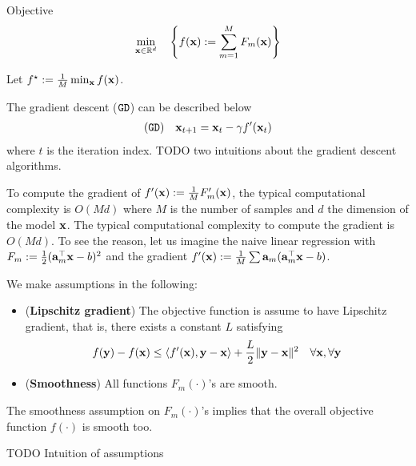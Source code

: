 Objective
\begin{align}
\min_{{\bf x} \in \mathbb{R}^d}\quad \left\{f({\bf x}):=\sum_{m=1}^M F_m({\bf x})\right\}
\label{eq:obj-gd}
\end{align}

Let $f^\star := {1\over M}\min_{{\bf x}} f({\bf x})$.

The gradient descent ($\texttt{GD}$) can be described below
\begin{align}
(\texttt{GD})\quad{\bf x}_{t+1} = {\bf x}_t - \gamma f'({\bf x}_t)
\label{eq:gd}
\end{align}
where $t$ is the iteration index.
{\rc TODO two intuitions about the gradient descent algorithms.}

To compute the gradient of $f'({\bf x}):={1\over M} F'_m({\bf x})$, the typical computational complexity is $O(Md)$ where $M$ is the number of samples and $d$ the dimension of the model ${\bf x}$. 
The typical computational complexity to compute the gradient is $O(Md)$. To see the reason, let us imagine the naive linear regression with $F_m:= {1\over 2}({\bf a}_m^\top {\bf x} -b)^2$ and the gradient $f'({\bf x}):={1\over M}\sum{\bf a}_m({\bf a}_m^\top {\bf x} - b)$.

\begin{tcolorbox}[colback=pink!5!white,colframe=black!75!black]
\begin{assumption} \label{ass:gd}
We make assumptions in the following:
\begin{itemize}
\item ({\bf Lipschitz gradient}) The objective function is assume to have Lipschitz gradient, that is, there exists a constant $L$ satisfying
\begin{align*}
f({\bf y}) - f({\bf x}) \leq \langle f'({\bf x}), {\bf y}-{\bf x} \rangle + {L\over 2} \|{\bf y} - {\bf x}\|^2 \quad \forall {\bf x}, \forall{\bf y}
\end{align*}
\item ({\bf Smoothness}) All functions $F_m(\cdot)$'s are smooth.
\end{itemize}
\end{assumption}
\end{tcolorbox}
The smoothness assumption on $F_m(\cdot)$'s implies that the overall objective function $f(\cdot)$ is smooth too.

{\rc TODO Intuition of assumptions}

